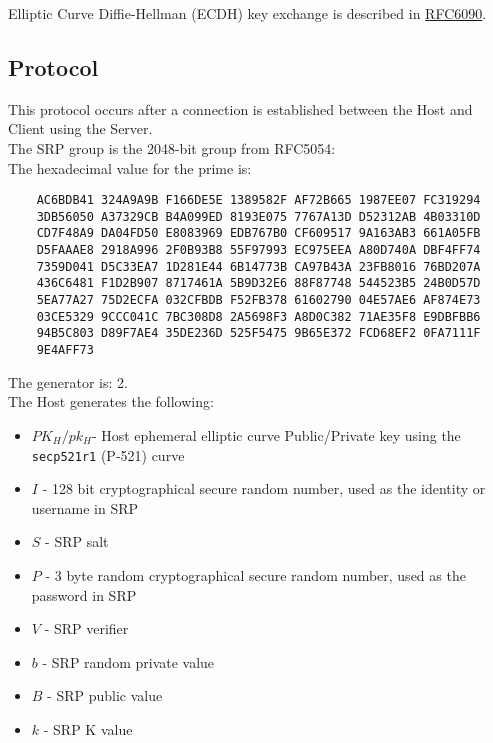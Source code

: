 \documentclass{article}
\begin{document}
    Elliptic Curve Diffie-Hellman (ECDH) key exchange is described in
    \href{https://datatracker.ietf.org/doc/html/rfc60904}{RFC6090}.\\

    \subsection{Protocol}

    This protocol occurs after a connection is established between the Host and
    Client using the Server.\\

    The SRP group is the 2048-bit group from RFC5054:\\

    The hexadecimal value for the prime is:\\

    \begin{verbatim}
    AC6BDB41 324A9A9B F166DE5E 1389582F AF72B665 1987EE07 FC319294
    3DB56050 A37329CB B4A099ED 8193E075 7767A13D D52312AB 4B03310D
    CD7F48A9 DA04FD50 E8083969 EDB767B0 CF609517 9A163AB3 661A05FB
    D5FAAAE8 2918A996 2F0B93B8 55F97993 EC975EEA A80D740A DBF4FF74
    7359D041 D5C33EA7 1D281E44 6B14773B CA97B43A 23FB8016 76BD207A
    436C6481 F1D2B907 8717461A 5B9D32E6 88F87748 544523B5 24B0D57D
    5EA77A27 75D2ECFA 032CFBDB F52FB378 61602790 04E57AE6 AF874E73
    03CE5329 9CCC041C 7BC308D8 2A5698F3 A8D0C382 71AE35F8 E9DBFBB6
    94B5C803 D89F7AE4 35DE236D 525F5475 9B65E372 FCD68EF2 0FA7111F
    9E4AFF73
    \end{verbatim}

    The generator is: 2.\\

    The Host generates the following:\\

    \begin{itemize}
        \item $PK_H/pk_H$- Host ephemeral elliptic curve Public/Private
        key using the \texttt{secp521r1} (P-521) curve
        \item $I$ - 128 bit cryptographical secure random number, used as the identity or
        username in SRP
        \item $S$ - SRP salt
        \item $P$ - 3 byte random cryptographical secure random number, used as the password
        in SRP
        \item $V$ - SRP verifier
        \item $b$ - SRP random private value
        \item $B$ - SRP public value
        \item $k$ - SRP K value
    \end{itemize}
\end{document}
